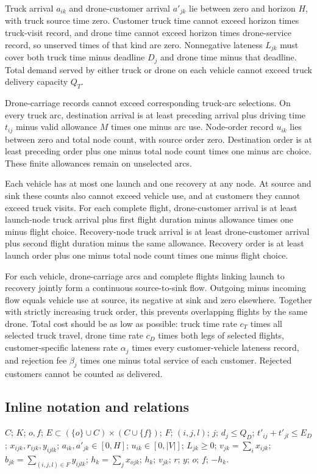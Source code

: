 \documentclass[10pt]{article}
\begin{document}
Truck arrival $a_{ik}$ and drone-customer arrival $a'_{jk}$ lie between zero and horizon $H$, with truck source time zero. Customer truck time cannot exceed horizon times truck-visit record, and drone time cannot exceed horizon times drone-service record, so unserved times of that kind are zero. Nonnegative lateness $L_{jk}$ must cover both truck time minus deadline $D_j$ and drone time minus that deadline. Total demand served by either truck or drone on each vehicle cannot exceed truck delivery capacity $Q_T$.

Drone-carriage records cannot exceed corresponding truck-arc selections. On every truck arc, destination arrival is at least preceding arrival plus driving time $t_{ij}$ minus valid allowance $M$ times one minus arc use. Node-order record $u_{ik}$ lies between zero and total node count, with source order zero. Destination order is at least preceding order plus one minus total node count times one minus arc choice. These finite allowances remain on unselected arcs.

Each vehicle has at most one launch and one recovery at any node. At source and sink these counts also cannot exceed vehicle use, and at customers they cannot exceed truck visits. For each complete flight, drone-customer arrival is at least launch-node truck arrival plus first flight duration minus allowance times one minus flight choice. Recovery-node truck arrival is at least drone-customer arrival plus second flight duration minus the same allowance. Recovery order is at least launch order plus one minus total node count times one minus flight choice.

For each vehicle, drone-carriage arcs and complete flights linking launch to recovery jointly form a continuous source-to-sink flow. Outgoing minus incoming flow equals vehicle use at source, its negative at sink and zero elsewhere. Together with strictly increasing truck order, this prevents overlapping flights by the same drone. Total cost should be as low as possible: truck time rate $c_T$ times all selected truck travel, drone time rate $c_D$ times both legs of selected flights, customer-specific lateness rate $\alpha_j$ times every customer-vehicle lateness record, and rejection fee $\beta_j$ times one minus total service of each customer. Rejected customers cannot be counted as delivered.

\subsection*{Inline notation and relations}
$C$; $K$; $o,f$; $E\subset(\{o\}\cup C)\times(C\cup\{f\})$; $F$; $(i,j,l)$; $j$; $d_j\le Q_D$; $t'_{ij}+t'_{jl}\le E_D$; $x_{ijk},r_{ijk},y_{ijlk}$; $a_{ik},a'_{jk}\in[0,H]$; $u_{ik}\in[0,|V|]$; $L_{jk}\ge0$; $v_{jk}=\sum_i x_{ijk}$; $b_{jk}=\sum_{(i,j,l)\in F}y_{ijlk}$; $h_k=\sum_jx_{ojk}$; $h_k$; $v_{jk}$; $r$; $y$; $o$; $f$; $-h_k$.
\end{document}
